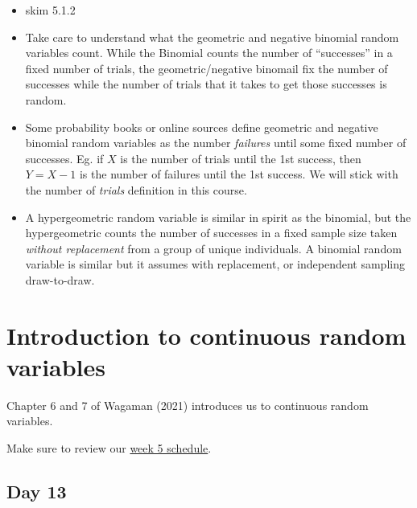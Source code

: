 \documentclass[
  letterpaper,
]{scrbook}
\providecommand{\tightlist}{%
  \setlength{\itemsep}{0pt}\setlength{\parskip}{0pt}}\usepackage{longtable,booktabs,array}
\begin{document}
\begin{itemize}
\tightlist
\item
  skim 5.1.2
\item
  Take care to understand what the geometric and negative binomial
  random variables count. While the Binomial counts the number of
  ``successes'' in a fixed number of trials, the geometric/negative
  binomail fix the number of successes while the number of trials that
  it takes to get those successes is random.
\item
  Some probability books or online sources define geometric and negative
  binomial random variables as the number \emph{failures} until some
  fixed number of successes. Eg. if \(X\) is the number of trials until
  the 1st success, then \(Y = X-1\) is the number of failures until the
  1st success. We will stick with the number of \emph{trials} definition
  in this course.
\item
  A hypergeometric random variable is similar in spirit as the binomial,
  but the hypergeometric counts the number of successes in a fixed
  sample size taken \emph{without replacement} from a group of unique
  individuals. A binomial random variable is similar but it assumes with
  replacement, or independent sampling draw-to-draw.
\end{itemize}


\chapter{Introduction to continuous random
variables}\label{sec-intro-cont-rv}

Chapter 6 and 7 of Wagaman (2021) introduces us to continuous random
variables.

Make sure to review our
\href{https://docs.google.com/spreadsheets/d/1p4s9FLap8CUB40UYAzdxpDi8-PkoHUceGq0dNUmfE9c/edit?usp=sharing}{week
5 schedule}.

\section*{Day 13}\label{day-13}

\end{document}
